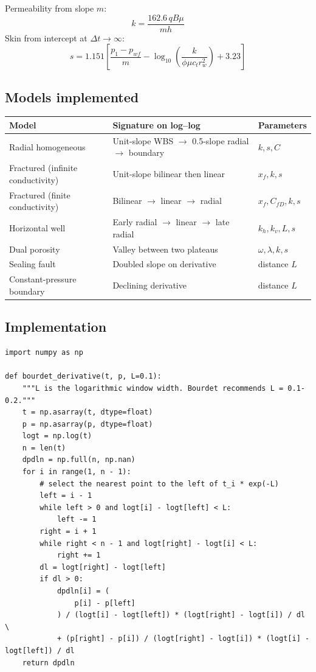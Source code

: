 \documentclass[11pt,a4paper]{article}
\begin{document}
Permeability from slope $m$:
\begin{equation}
k = \frac{162.6 \, q B \mu}{m h}
\end{equation}
Skin from intercept at $\Delta t \to \infty$:
\begin{equation}
s = 1.151 \left[ \frac{p_1 - p_{wf}}{m} - \log_{10}\!\left(\frac{k}{\phi \mu c_t r_w^2}\right) + 3.23 \right]
\end{equation}

\subsection{Models implemented}

\begin{longtable}{@{}p{3.0cm}p{5.5cm}p{6.0cm}@{}}
\toprule
\textbf{Model} & \textbf{Signature on log--log} & \textbf{Parameters}\\
\midrule
\endhead
Radial homogeneous & Unit-slope WBS $\to$ 0.5-slope radial $\to$ boundary & $k, s, C$\\
Fractured (infinite conductivity) & Unit-slope bilinear then linear & $x_f, k, s$\\
Fractured (finite conductivity) & Bilinear $\to$ linear $\to$ radial & $x_f, C_{fD}, k, s$\\
Horizontal well & Early radial $\to$ linear $\to$ late radial & $k_h, k_v, L, s$\\
Dual porosity & Valley between two plateaus & $\omega, \lambda, k, s$\\
Sealing fault & Doubled slope on derivative & distance $L$\\
Constant-pressure boundary & Declining derivative & distance $L$\\
\bottomrule
\end{longtable}

\subsection{Implementation}

\begin{lstlisting}[caption={Bourdet derivative with configurable window.}]
import numpy as np

def bourdet_derivative(t, p, L=0.1):
    """L is the logarithmic window width. Bourdet recommends L = 0.1-0.2."""
    t = np.asarray(t, dtype=float)
    p = np.asarray(p, dtype=float)
    logt = np.log(t)
    n = len(t)
    dpdln = np.full(n, np.nan)
    for i in range(1, n - 1):
        # select the nearest point to the left of t_i * exp(-L)
        left = i - 1
        while left > 0 and logt[i] - logt[left] < L:
            left -= 1
        right = i + 1
        while right < n - 1 and logt[right] - logt[i] < L:
            right += 1
        dl = logt[right] - logt[left]
        if dl > 0:
            dpdln[i] = (
                p[i] - p[left]
            ) / (logt[i] - logt[left]) * (logt[right] - logt[i]) / dl \
            + (p[right] - p[i]) / (logt[right] - logt[i]) * (logt[i] - logt[left]) / dl
    return dpdln
\end{lstlisting}
\end{document}
